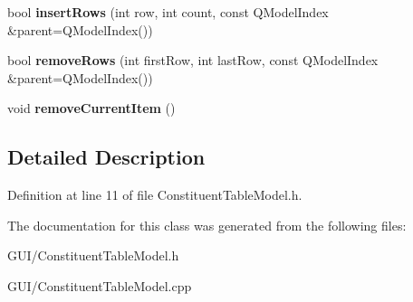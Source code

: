 \begin{DoxyCompactItemize}
bool {\bfseries insert\+Rows} (int row, int count, const Q\+Model\+Index \&parent=Q\+Model\+Index())
\item 
\mbox{\label{class_constituent_table_model_a2fef09a2c8b981996133b0a5efeba7df}} 
bool {\bfseries remove\+Rows} (int first\+Row, int last\+Row, const Q\+Model\+Index \&parent=Q\+Model\+Index())
\item 
\mbox{\label{class_constituent_table_model_ad231498bacafb204dfbdbf353750db67}} 
void {\bfseries remove\+Current\+Item} ()
\end{DoxyCompactItemize}


\subsection{Detailed Description}


Definition at line 11 of file Constituent\+Table\+Model.\+h.



The documentation for this class was generated from the following files\+:\begin{DoxyCompactItemize}
\item 
G\+U\+I/Constituent\+Table\+Model.\+h\item 
G\+U\+I/Constituent\+Table\+Model.\+cpp\end{DoxyCompactItemize}
